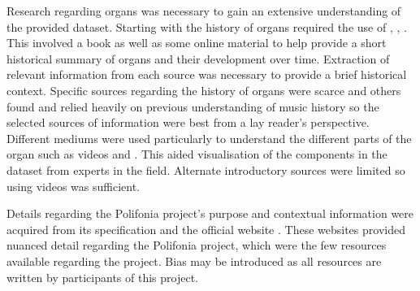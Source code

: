 Research regarding organs was necessary to gain an extensive understanding of the provided dataset. Starting with the history of organs required the use of \cite{organhistory}, \cite{organhistory1}, \cite{organmedivalhistory}. This involved a book as well as some online material to help provide a short historical summary of organs and their development over time. Extraction of relevant information from each source was necessary to provide a brief historical context. Specific sources regarding the history of organs were scarce and others found \cite{apel1948early} and \cite{ochse1988history} relied heavily on previous understanding of music history so the selected sources of information were best from a lay reader's perspective. Different mediums were used particularly to understand the different parts of the organ such as videos \cite{organvideo} and \cite{organvideo1}. This aided visualisation of the components in the dataset from experts in the field. Alternate introductory sources were limited so using videos was sufficient. 

Details regarding the Polifonia project's purpose and contextual information were acquired from its specification \cite{polifoniaproject} and the official website \cite{polifonia}. These websites provided nuanced detail regarding the Polifonia project, which were the few resources available regarding the project. Bias may be introduced as all resources are written by participants of this project. 

